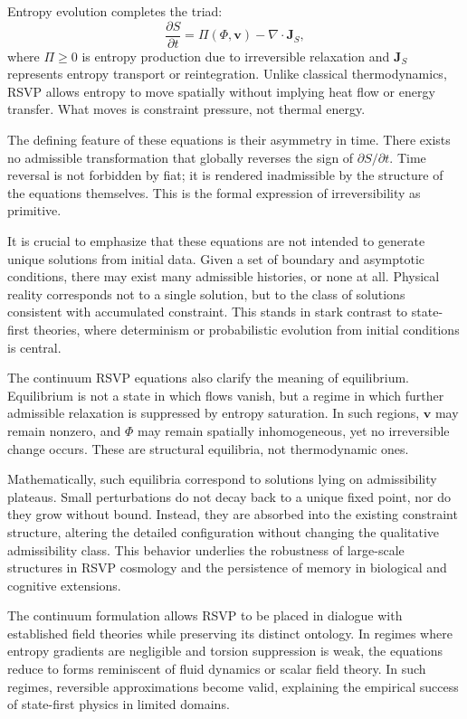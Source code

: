 \documentclass[11pt,oneside]{book}
\begin{document}
Entropy evolution completes the triad:
\[
\frac{\partial S}{\partial t} = \Pi(\Phi,\mathbf{v}) - \nabla \cdot \mathbf{J}_S,
\]
where \(\Pi \ge 0\) is entropy production due to irreversible relaxation and \(\mathbf{J}_S\) represents entropy transport or reintegration. Unlike classical thermodynamics, RSVP allows entropy to move spatially without implying heat flow or energy transfer. What moves is constraint pressure, not thermal energy.

The defining feature of these equations is their asymmetry in time. There exists no admissible transformation that globally reverses the sign of \(\partial S / \partial t\). Time reversal is not forbidden by fiat; it is rendered inadmissible by the structure of the equations themselves. This is the formal expression of irreversibility as primitive.

It is crucial to emphasize that these equations are not intended to generate unique solutions from initial data. Given a set of boundary and asymptotic conditions, there may exist many admissible histories, or none at all. Physical reality corresponds not to a single solution, but to the class of solutions consistent with accumulated constraint. This stands in stark contrast to state-first theories, where determinism or probabilistic evolution from initial conditions is central.

The continuum RSVP equations also clarify the meaning of equilibrium. Equilibrium is not a state in which flows vanish, but a regime in which further admissible relaxation is suppressed by entropy saturation. In such regions, \(\mathbf{v}\) may remain nonzero, and \(\Phi\) may remain spatially inhomogeneous, yet no irreversible change occurs. These are structural equilibria, not thermodynamic ones.

Mathematically, such equilibria correspond to solutions lying on admissibility plateaus. Small perturbations do not decay back to a unique fixed point, nor do they grow without bound. Instead, they are absorbed into the existing constraint structure, altering the detailed configuration without changing the qualitative admissibility class. This behavior underlies the robustness of large-scale structures in RSVP cosmology and the persistence of memory in biological and cognitive extensions.

The continuum formulation allows RSVP to be placed in dialogue with established field theories while preserving its distinct ontology. In regimes where entropy gradients are negligible and torsion suppression is weak, the equations reduce to forms reminiscent of fluid dynamics or scalar field theory. In such regimes, reversible approximations become valid, explaining the empirical success of state-first physics in limited domains.
\end{document}
